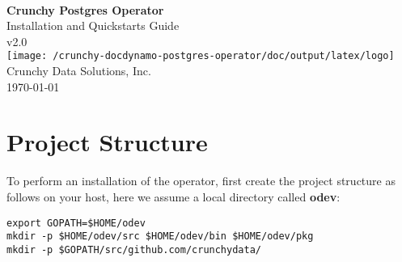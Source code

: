 \documentclass[letterpaper,12pt]{article}
\let\stdsection\section
\renewcommand\section{\newpage\stdsection}
\begin{document}
\hypersetup{pageanchor=false}

\makeatletter
    \begin{titlepage}
        \begin{center}
            {\large \ }\\[18ex]
            {\huge \bfseries Crunchy Postgres Operator}\\[1ex]
            {\large Installation and Quickstarts Guide}\\[12ex]
            {\large v2.0}\\[12ex]
            \texttt{[image: /crunchy-docdynamo-postgres-operator/doc/output/latex/logo]}\\[12ex]
            {\large Crunchy Data Solutions, Inc.}\\[1ex]
            {\large \today}
        \end{center}
    \end{titlepage}
\makeatother
\thispagestyle{empty}
\newpage

\hypersetup{pageanchor=true}

\setcounter{tocdepth}{3}
\thispagestyle{plain}
\renewcommand\contentsname{Table of Contents}
\tableofcontents


\section{Project Structure}\label{/_project_structure}

To perform an installation of the operator, first create the project structure as follows on your host, here we assume a local directory called \textbf{odev}:
\vspace{.75em}
\begin{lstlisting}
export GOPATH=$HOME/odev
mkdir -p $HOME/odev/src $HOME/odev/bin $HOME/odev/pkg
mkdir -p $GOPATH/src/github.com/crunchydata/
\end{lstlisting}
\end{document}
